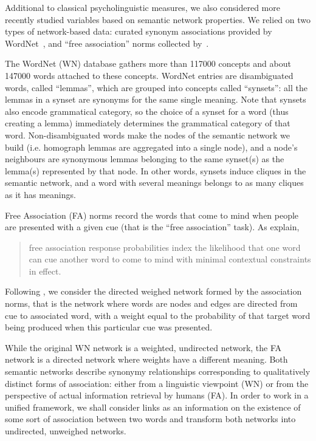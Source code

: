 Additional to classical psycholinguistic measures, we also considered more recently studied variables based on semantic network properties.
We relied on two types of network-based data: curated synonym associations provided by WordNet~\citep{WordNet10}, and ``free association'' norms collected by~\citet{Nelson04}.

The WordNet (WN) database gathers more than \num{117000} concepts and about \num{147000} words attached to these concepts.
WordNet entries are disambiguated words, called ``lemmas'', which are grouped into concepts called ``synsets'': all the lemmas in a synset are synonyms for the same single meaning.
Note that synsets also encode grammatical category, so the choice of a synset for a word (thus creating a lemma) immediately determines the grammatical category of that word.
Non-disambiguated words make the nodes of the semantic network we build (i.e. homograph lemmas are aggregated into a single node), and a node's neighbours are synonymous lemmas belonging to the same synset(s) as the lemma(s) represented by that node.
In other words, synsets induce cliques in the semantic network, and a word with several meanings belongs to as many cliques as it has meanings.

Free Association (FA) norms record the words that come to mind when people are presented with a given cue (that is the ``free association'' task).
As \citeauthor{Nelson04} explain,
\begin{quote}
free association response probabilities index the likelihood that one word can cue another word to come to mind with minimal contextual constraints in effect.~\citep{Nelson04}
\end{quote}
Following \citet{Griffiths07}, we consider the directed weighed network formed by the association norms, that is the network where words are nodes and edges are directed from cue to associated word, with a weight equal to the probability of that target word being produced when this particular cue was presented.

While the original WN network is a weighted, undirected network, the FA network is a directed network where weights have a different meaning.
Both semantic networks describe synonymy relationships corresponding to qualitatively distinct forms of association: either from a linguistic viewpoint (WN) or from the perspective of actual information retrieval by humans (FA).
In  order to work in a unified framework, we shall consider links as an information on the existence of some sort of association between two words and transform both networks into undirected, unweighed networks.

